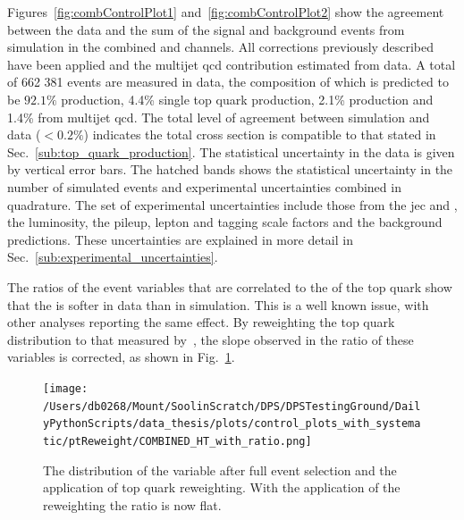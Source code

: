 Figures~\ref{fig:combControlPlot1} and~\ref{fig:combControlPlot2} show the agreement between the data and the sum of the signal and background events from simulation in the combined \eJets{} and \muJets{} channels.
All corrections previously described have been applied and the multijet \acrshort{qcd} contribution estimated from data.
A total of 662 381 events are measured in data, the composition of which is predicted to be $92.1\%$ \ttbar{} production, 4.4\% single top quark production, 2.1\% \Vjets{} production and 1.4\% from multijet \acrshort{qcd}.
The total level of agreement between simulation and data ($<0.2\%$) indicates the total cross section is compatible to that stated in Sec.~\ref{sub:top_quark_production}.
The statistical uncertainty in the data is given by vertical error bars.
The hatched bands shows the statistical uncertainty in the number of simulated events and experimental uncertainties combined in quadrature.
The set of experimental uncertainties include those from the \acrshort{jec} and \ptmiss{}, the luminosity, the pileup, lepton and \bquark{} tagging scale factors and the background predictions.
These uncertainties are explained in more detail in Sec.~\ref{sub:experimental_uncertainties}.
\label{sec:data_simulation_agreement_in_the_signal_region}

The ratios of the event variables that are correlated to the \pt{} of the top quark show that the \ptTop{} is softer in data than in simulation.
This is a well known issue, with other analyses reporting the same effect. 
By reweighting the top quark \pt{} distribution to that measured by~\cite{TOP16007,TOP16008}, the slope observed in the ratio of these variables is corrected, as shown in Fig.~\ref{fig:combPtReweight}.

\begin{figure}[hp!]
	\centering	\texttt{[image: /Users/db0268/Mount/SoolinScratch/DPS/DPSTestingGround/DailyPythonScripts/data\_thesis/plots/control\_plots\_with\_systematic/ptReweight/COMBINED\_HT\_with\_ratio.png]}
	\caption[The distribution of the \HT{} variable after full event selection and the application of top quark \pt{} reweighting. With the application of the reweighting the ratio is now flat.]{The distribution of the \HT{} variable after full event selection and the application of top quark \pt{} reweighting. With the application of the reweighting the ratio is now flat.}
	\label{fig:combPtReweight}
\end{figure}


